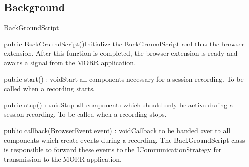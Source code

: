 \subsection{Background}
\begin{class}{BackGroundScript}


\begin{constructors}
\begin{constructor}{public BackGroundScript()}{Initialize the BackGroundScript and thus the browser extension. After this function is completed, the browser extension is ready and awaits a signal from the MORR application.}
\end{constructor}
\end{constructors}
\begin{methods}
\begin{method}{public start() : void}{Start all components necessary for a session recording. To be called when a recording starts.}
\end{method}
\begin{method}{public stop() : void}{Stop all components which should only be active during a session recording. To be called when a recording stops.}
\end{method}
\begin{method}{public callback(BrowserEvent event) : void}{Callback to be handed over to all components which create events during a recording. The BackGroundScript class is responsible to forward these events to the ICommunicationStrategy for transmission to the MORR application.}
\begin{parameters}
\end{parameters}
\end{method}
\end{methods}
\end{class}

